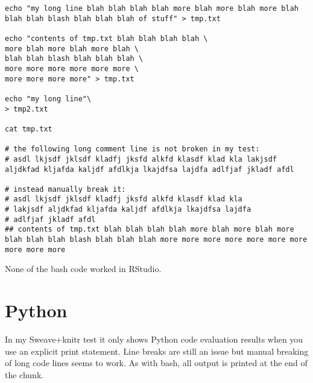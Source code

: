 \documentclass{article}\usepackage{graphicx, color}
\makeatletter
\newenvironment{kframe}{%
 \def\at@end@of@kframe{}%
 \ifinner\ifhmode%
  \def\at@end@of@kframe{\end{minipage}}%
  \begin{minipage}{\columnwidth}%
 \fi\fi%
 \def\FrameCommand##1{\hskip\@totalleftmargin \hskip-\fboxsep
 \colorbox{shadecolor}{##1}\hskip-\fboxsep
     \hskip-\linewidth \hskip-\@totalleftmargin \hskip\columnwidth}%
 \MakeFramed {\advance\hsize-\width
   \@totalleftmargin\z@ \linewidth\hsize
   \@setminipage}}%
 {\par\unskip\endMakeFramed%
 \at@end@of@kframe}
\newenvironment{knitrout}{}{} %
\makeatother
\begin{document}
\begin{knitrout}
\color{fgcolor}\begin{kframe}
\begin{verbatim}
echo "my long line blah blah blah blah more blah more blah more blah blah blah blash blah blah blah of stuff" > tmp.txt
  
echo "contents of tmp.txt blah blah blah blah \
more blah more blah more blah \
blah blah blash blah blah blah \
more more more more more more \
more more more more" > tmp.txt

echo "my long line"\
> tmp2.txt

cat tmp.txt

# the following long comment line is not broken in my test:
# asdl lkjsdf jklsdf kladfj jksfd alkfd klasdf klad kla lakjsdf aljdkfad kljafda kaljdf afdlkja lkajdfsa lajdfa adlfjaf jkladf afdl

# instead manually break it:
# asdl lkjsdf jklsdf kladfj jksfd alkfd klasdf klad kla 
# lakjsdf aljdkfad kljafda kaljdf afdlkja lkajdfsa lajdfa 
# adlfjaf jkladf afdl
## contents of tmp.txt blah blah blah blah more blah more blah more blah blah blah blash blah blah blah more more more more more more more more more more
\end{verbatim}
\end{kframe}
\end{knitrout}


None of the bash code worked in RStudio.

\section{Python}

In my Sweave+knitr test it only shows Python code evaluation results when you use an explicit print statement. Line breaks are still an issue but manual breaking of long code lines seems to work. As with bash, all output is printed at the end of the chunk.
\end{document}
